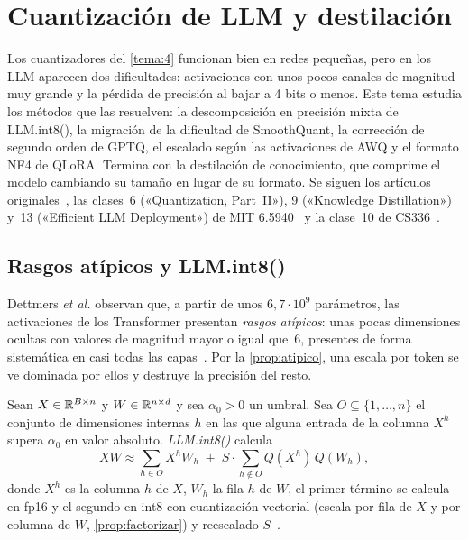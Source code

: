 \chapter{Cuantización de LLM y destilación}
\label{tema:5}

Los cuantizadores del \cref{tema:4} funcionan bien en redes pequeñas, pero en los LLM aparecen dos dificultades: activaciones con unos pocos canales de magnitud muy grande y la pérdida de precisión al bajar a 4 bits o menos. Este tema estudia los métodos que las resuelven: la descomposición en precisión mixta de LLM.int8(), la migración de la dificultad de SmoothQuant, la corrección de segundo orden de GPTQ, el escalado según las activaciones de AWQ y el formato NF4 de QLoRA. Termina con la destilación de conocimiento, que comprime el modelo cambiando su tamaño en lugar de su formato. Se siguen los artículos originales~\cite{llmint8,smoothquant,gptq,awq,qlora,hinton}, las clases~6 («Quantization, Part~II»), 9 («Knowledge Distillation») y~13 («Efficient LLM Deployment») de MIT 6.5940~\cite{mit65940} y la clase~10 de CS336~\cite{cs336}.

\section{Rasgos atípicos y LLM.int8()}

Dettmers \emph{et al.} observan que, a partir de unos $6{,}7\cdot 10^{9}$ parámetros, las activaciones de los Transformer presentan \emph{rasgos atípicos}: unas pocas dimensiones ocultas con valores de magnitud mayor o igual que~6, presentes de forma sistemática en casi todas las capas~\cite[§4]{llmint8}. Por la \cref{prop:atipico}, una escala por token se ve dominada por ellos y destruye la precisión del resto.

\begin{definicion}\label{def:llmint8}
Sean $X\in\mathbb{R}^{B\times n}$ y $W\in\mathbb{R}^{n\times d}$ y sea $\alpha_0>0$ un umbral. Sea $O\subseteq\{1,\dots,n\}$ el conjunto de dimensiones internas $h$ en las que alguna entrada de la columna $X^{h}$ supera $\alpha_0$ en valor absoluto. \emph{LLM.int8()} calcula
\[
XW\approx\sum_{h\in O}X^{h}W_{h}\;+\;S\cdot\sum_{h\notin O}Q(X^{h})\,Q(W_{h}),
\]
donde $X^{h}$ es la columna $h$ de $X$, $W_{h}$ la fila $h$ de $W$, el primer término se calcula en fp16 y el segundo en int8 con cuantización vectorial (escala por fila de $X$ y por columna de $W$, \cref{prop:factorizar}) y reescalado $S$~\cite[§3.2]{llmint8}.
\end{definicion}

